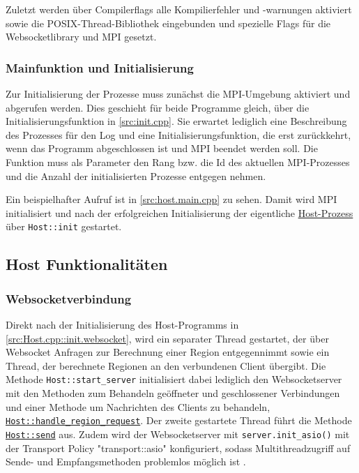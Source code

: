 Zuletzt werden über Compilerflags alle Kompilierfehler und -warnungen aktiviert sowie die POSIX-Thread-Bibliothek eingebunden
und spezielle Flags für die Websocketlibrary und MPI gesetzt.

\subsubsection{Mainfunktion und Initialisierung}

Zur Initialisierung der Prozesse muss zunächst die MPI-Umgebung aktiviert und abgerufen werden.
Dies geschieht für beide Programme gleich, über die Initialisierungsfunktion in \autoref{src:init.cpp}.
Sie erwartet lediglich eine Beschreibung des Prozesses für den Log und eine Initialisierungsfunktion,
die erst zurückkehrt, wenn das Programm abgeschlossen ist und MPI beendet werden soll.
Die Funktion muss als Parameter den Rang bzw. die Id des aktuellen MPI-Prozesses und die Anzahl der initialisierten
Prozesse entgegen nehmen.

Ein beispielhafter Aufruf ist in \autoref{src:host.main.cpp} zu sehen. Damit wird MPI initialisiert und nach der
erfolgreichen Initialisierung der eigentliche \hyperref[cls:Host]{Host-Prozess} über \verb|Host::init| gestartet.

\begin{figure}[h]
	
\end{figure}

\begin{figure}
	
\end{figure}

\subsection{Host Funktionalitäten}\label{cls:Host}

\subsubsection{Websocketverbindung}

Direkt nach der Initialisierung des Host-Programms in \autoref{src:Host.cpp::init.websocket}, wird ein separater Thread gestartet, der über Websocket
Anfragen zur Berechnung einer Region entgegennimmt sowie ein Thread, der berechnete Regionen an den verbundenen Client übergibt.
Die Methode \verb|Host::start_server| initialisiert dabei lediglich den Websocketserver mit den Methoden zum Behandeln geöffneter und geschlossener Verbindungen und
einer Methode um Nachrichten des Clients zu behandeln, \hyperref[cls:Host::handle_region_request]{\texttt{Host::handle\_region\_request}}.
Der zweite gestartete Thread führt die Methode \hyperref[cls:Host::send]{\texttt{Host::send}} aus.
Zudem wird der Websocketserver mit \verb|server.init_asio()| mit der Transport Policy "transport::asio"
konfiguriert, sodass Multithreadzugriff auf Sende- und Empfangsmethoden problemlos möglich ist \cite{websocketppManual}.

